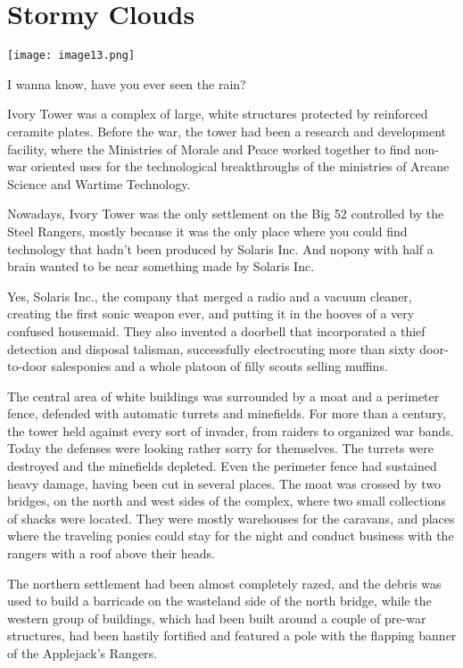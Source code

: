 
\chapter{Stormy Clouds}

\texttt{[image: image13.png]}

\begin{intro}
I wanna know, have you ever seen the rain?
\end{intro}



Ivory Tower was a complex of large, white structures protected by reinforced ceramite plates. Before the war, the tower had been a research and development facility, where the Ministries of Morale and Peace worked together to find non-war oriented uses for the technological breakthroughs of the ministries of Arcane Science and Wartime Technology.

Nowadays, Ivory Tower was the only settlement on the Big 52 controlled by the Steel Rangers, mostly because it was the only place where you could find technology that hadn't been produced by Solaris Inc. And nopony with half a brain wanted to be near something made by Solaris Inc.

Yes, Solaris Inc., the company that merged a radio and a vacuum cleaner, creating the first sonic weapon ever, and putting it in the hooves of a very confused housemaid. They also invented a doorbell that incorporated a thief detection and disposal talisman, successfully electrocuting more than sixty door-to-door salesponies and a whole platoon of filly scouts selling muffins.

The central area of white buildings was surrounded by a moat and a perimeter fence, defended with automatic turrets and minefields. For more than a century, the tower held against every sort of invader, from raiders to organized war bands. Today the defenses were looking rather sorry for themselves. The turrets were destroyed and the minefields depleted. Even the perimeter fence had sustained heavy damage, having been cut in several places. The moat was crossed by two bridges, on the north and west sides of the complex, where two small collections of shacks were located. They were mostly warehouses for the caravans, and places where the traveling ponies could stay for the night and conduct business with the rangers with a roof above their heads.

The northern settlement had been almost completely razed, and the debris was used to build a barricade on the wasteland side of the north bridge, while the western group of buildings, which had been built around a couple of pre-war structures, had been hastily fortified and featured a pole with the flapping banner of the Applejack's Rangers.

